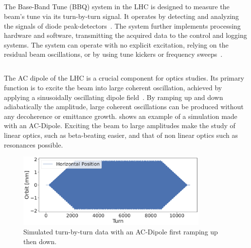 \subsection{}

The Base-Band Tune (BBQ) system in the LHC is designed to measure the beam's tune via its
turn-by-turn signal. It operates by detecting and analyzing the signals of diode
peak-detectors~\cite{boccardi_first_2009,gasior_high_2005}. The system further implements processing
hardware and software, transmitting the acquired data to the control and logging systems.  The
system can operate with no explicit excitation, relying on the residual beam oscillations, or by
using tune kickers or frequency sweeps~\cite{boccardi_first_2009}.


\subsection{}

The AC dipole of the LHC is a crucial component for optics studies. Its primary function is to
excite the beam into large coherent oscillation, achieved by applying a sinusoidally oscillating
dipole field~\cite{miyamoto_parametrization_2008}. By ramping up and down adiabatically the
amplitude, large coherent oscillations can be produced without any decoherence or emittance growth.
 shows an example of a simulation made with an AC-Dipole. Exciting the beam to
large amplitudes make the study of linear optics, such as beta-beating easier, and that of non
linear optics such as resonances possible.

\begin{figure}
    \center
    \includegraphics[width=0.85\textwidth]{./images/ac_dipole_tbt.pdf}
    \caption{Simulated turn-by-turn data with an AC-Dipole first ramping up then down.}
    \label{fig:ac_dipole}
\end{figure}

